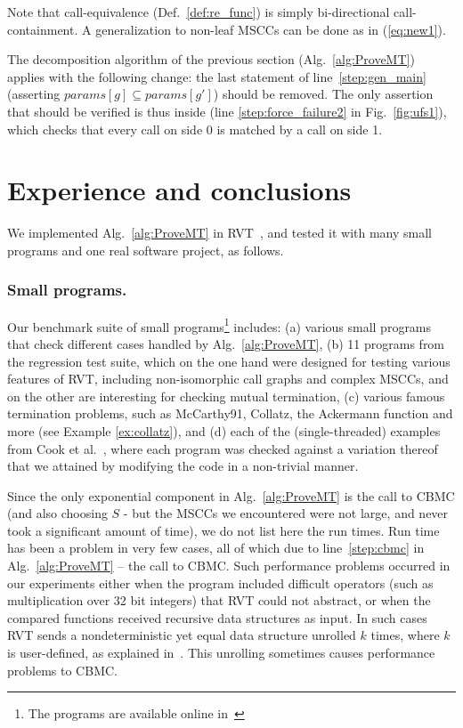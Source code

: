 %
Note that call-equivalence (Def.~\ref{def:re_func}) is simply bi-directional
call-containment.
A generalization to non-leaf MSCCs can be done as in (\ref{eq:new1}).

The decomposition algorithm of the previous section (Alg.~\ref{alg:ProveMT}) applies with the following
change: the last statement of line~\ref{step:gen_main} (asserting $params[g] \subseteq
params[g']$) should be removed. The only assertion that should be verified is thus inside
\pneufname (line \ref{step:force_failure2} in Fig.~\ref{fig:ufs1}), which checks that every call on side 0 is matched by a call on side 1.

\section{Experience and conclusions} \label{sec:experiments}
We implemented Alg.~\ref{alg:ProveMT} in RVT~\cite{GS09,EKSurl}, and tested it with many small programs and one real software project, as follows.

\subsubsection{Small programs.}
Our benchmark suite of small programs\footnote{The programs are available online in~\cite{EKSurl}} includes: (a) various small programs that check different cases handled by Alg.~\ref{alg:ProveMT}, (b) 11 programs from the 
regression test suite, which on the one hand were designed
for testing various features of RVT, including non-isomorphic call graphs and
complex MSCCs, and on the other are interesting for checking mutual termination, (c) various famous termination problems, such as McCarthy91, Collatz, the Ackermann function and more (see Example %
\ref{ex:collatz}), and (d) each of the (single-threaded) examples
from Cook et al.~\cite{CPR11}, where each program was checked against a variation thereof that we attained by
modifying the code in a non-trivial manner.

Since the only exponential component in Alg.~\ref{alg:ProveMT} is the call to
CBMC (and also choosing $S$ - but the MSCCs we encountered were not large, and
never took a significant amount of time), we do not list here the run times.
Run time has been a problem in very few cases, all of which due to line~\ref{step:cbmc} in Alg.~\ref{alg:ProveMT} -- the call to CBMC. Such performance problems occurred in our experiments either when the program included difficult operators (such as multiplication  over
32 bit integers) that RVT could not abstract, or when the compared functions
received recursive data structures as input. In such cases RVT sends a
nondeterministic yet equal data structure unrolled $k$ times, where $k$ is user-defined, as explained in~\cite{GS09}. This unrolling sometimes causes performance problems to CBMC.


